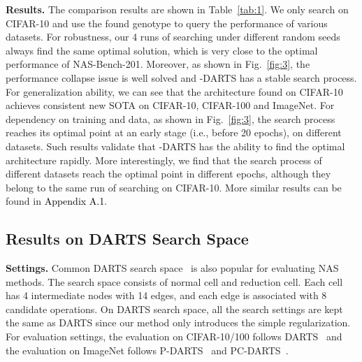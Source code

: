 \documentclass[10pt,twocolumn,letterpaper]{article}
\newcommand{\bp}[1]{\textcolor{black}{#1}}
\begin{document}
\noindent\textbf{Results.} The comparison results are shown in Table~\ref{tab:1}. We only search on CIFAR-10 and use the found genotype to query the performance of various datasets. For robustness, our 4 runs of searching under different random seeds always find the same optimal solution, which is very close to the optimal performance of NAS-Bench-201. Moreover, as shown in Fig.~\ref{fig:3}, the performance collapse issue is well solved and -DARTS has a stable search process. For generalization ability, we can see that the architecture found on CIFAR-10 achieves consistent new SOTA on CIFAR-10, CIFAR-100 and ImageNet. For dependency on training and data, as shown in Fig.~\ref{fig:3}, the search process reaches its optimal point at an early stage (i.e., before 20 epochs), on different datasets. Such results validate that -DARTS has the ability to find the optimal architecture rapidly. More interestingly, we find that the search process of different datasets reach the optimal point in different epochs, although they belong to the same run of searching on CIFAR-10. More similar results can be found in \bp{Appendix A.1}.

\subsection{Results on DARTS Search Space} 
\noindent\textbf{Settings.} Common DARTS search space~\cite{darts} is also popular for evaluating NAS methods. The search space consists of normal cell and reduction cell. Each cell has 4 intermediate nodes with 14 edges, and each edge is associated with 8 candidate operations. On DARTS search space, all the search settings are kept the same as DARTS since our method only introduces the simple regularization. For evaluation settings, the evaluation on CIFAR-10/100 follows DARTS~\cite{darts} and the evaluation on ImageNet follows P-DARTS~\cite{pdarts} and PC-DARTS~\cite{pc-darts}. 
\end{document}
